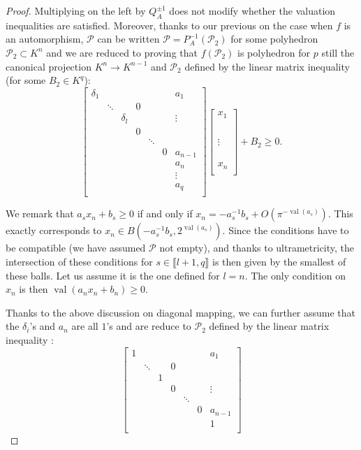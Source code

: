 \documentclass[a4paper,oneside,11pt]{article}
\newcommand{\PP}{\mathcal{P}}
\DeclareMathOperator{\val}{val}
\begin{document}
\begin{proof}
Multiplying on the left by $Q_A^{\pm 1}$ does not
modify whether the valuation inequalities are satisfied.
Moreover, thanks to our previous on the case when $f$ is an automorphism,
$\PP$ can be written
$\PP=P_A^{-1}(\PP_2)$ for some polyhedron $\PP_2 \subset K^n$
and we are reduced to proving that
$f(\PP_2)$ is polyhedron for $p$ still the canonical projection
$K^n \rightarrow K^{n-1}$ and $\PP_2$
defined by the linear matrix inequality (for some $B_2 \in K^q$):
\[  \begin{bmatrix}
\delta_1	& 		& 			&   &		 &  &a_1	\\
			& \ddots& 			& 0	&		 &	&		\\
			&		& \delta_l  &   & 		 &	& \vdots\\
			&		&			&0  & 		 &	& 		\\
			&		&			&   & \ddots &	&		\\
			&		&			&	&		 & 0&a_{n-1} \\
			&		&			&	&		 &	&a_n 	\\
			&		&			&	&		 &	& \vdots   	\\
			&		&			&	&		 &	&a_q 	\\			
\end{bmatrix} \begin{bmatrix} x_1 \\ \\ \\ \\ \\ \vdots \\ \\ \\ \\ x_n \\ \end{bmatrix} + B_2 \geq 0.\]



We remark that 
$a_s x_n + b_s \geq 0$
if and only if $x_n = -a_s^{-1} b_s + O(\pi^{- \val(a_s)}).$
This exactly corresponds to $x_n \in B(-a_s^{-1} b_s, 2^{\val(a_s)}).$
Since the conditions have to be compatible (we have assumed
$\PP$ not empty), and thanks to ultrametricity,  
the intersection of these conditions for 
$s \in \llbracket l+1,q \rrbracket$
is then given by the smallest of these balls.
Let us assume it is the one defined for $l=n.$
The only condition on $x_n$
is then $\val(a_nx_n +b_n) \geq 0.$

Thanks to the above discussion on diagonal mapping,
we can further assume that the $\delta_i$'s and $a_n$ are all $1$'s
and are reduce to $\PP_2$ defined by the linear matrix inequality :
\[  \begin{bmatrix}
1	& 		& 			&   &		 &  &a_1	\\
			& \ddots& 			& 0	&		 &	&		\\
			&		& 1  &   & 		 &	& \\
			&		&			&0  & 		 &	& 	\vdots	\\
			&		&			&   & \ddots &	&		\\
			&		&			&	&		 & 0&a_{n-1} \\
			&		&			&	&		 &	&1 	\\
		

\end{bmatrix}\]
\end{proof}
\end{document}
